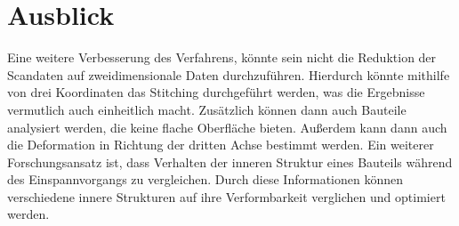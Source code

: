 \section{Ausblick}

Eine weitere Verbesserung des Verfahrens, könnte sein nicht die Reduktion der 
Scandaten auf zweidimensionale Daten durchzuführen. 
Hierdurch könnte mithilfe von drei Koordinaten das Stitching durchgeführt werden, 
was die Ergebnisse vermutlich auch einheitlich macht. Zusätzlich können 
dann auch Bauteile analysiert werden, die keine flache Oberfläche bieten.
Außerdem kann dann auch die Deformation in Richtung der dritten Achse bestimmt werden. 
Ein weiterer Forschungsansatz ist, dass Verhalten der inneren Struktur eines Bauteils 
während des Einspannvorgangs zu vergleichen. Durch diese Informationen können 
verschiedene innere Strukturen auf ihre Verformbarkeit verglichen und optimiert werden. 


